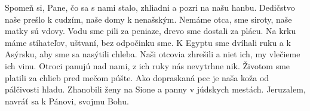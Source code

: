 Spomeň si, Pane, čo sa s nami stalo,
zhliadni a pozri na našu hanbu.
\versseparator
Dedičstvo naše prešlo k cudzím,
naše domy k nenašským.
\versseparator
Nemáme otca, sme siroty,
naše matky sú vdovy.
\versseparator
Vodu sme pili za peniaze,
drevo sme dostali za plácu.
\versseparator
Na krku máme stíhateľov,
uštvaní, bez odpočinku sme.
\versseparator
K Egyptu sme dvíhali ruku a k Asýrsku,
aby sme sa nasýtili chleba.
\versseparator
Naši otcovia zhrešili a niet ich,
my vlečieme ich vinu.
\versseparator
Otroci panujú nad nami,
z ich ruky nás nevytrhne nik.
\versseparator
Životom sme platili za chlieb
pred mečom púšte.
\versseparator
Ako dopraskaná pec je naša koža
od pálčivosti hladu.
\versseparator
Zhanobili ženy na Sione
a panny v júdskych mestách.
\versseparator
Jeruzalem, navráť sa k Pánovi, svojmu Bohu.